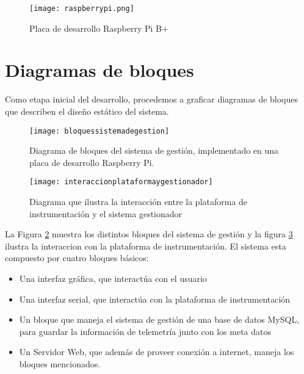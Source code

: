 \begin{figure}[h]
  \centering
  \texttt{[image: raspberrypi.png]}
  \caption{Placa de desarrollo Raspberry Pi B+}\label{fig:raspberrypi}
\end{figure}

\section{Diagramas de bloques} %
\label{it7:sec:diagramas_de_bloques}

Como etapa inicial del desarrollo, procedemos a graficar diagramas de bloques que describen el diseño estático del sistema.

\begin{figure}[h]
  \centering
  \texttt{[image: bloquessistemadegestion]}
  \caption{Diagrama de bloques del sistema de gestión, implementado en una placa de desarrollo Raspberry Pi.}\label{fig:bloquessistemadegestion}
\end{figure}

\begin{figure}[h]
  \centering
  \texttt{[image: interaccionplataformaygestionador]}
  \caption{Diagrama que ilustra la interacción entre la plataforma de instrumentación y el sistema gestionador}\label{fig:interaccionplataformaygestionador}
\end{figure}

La Figura \ref{fig:bloquessistemadegestion} muestra los distintos bloques del sistema de gestión y la figura \ref{fig:interaccionplataformaygestionador} ilustra la interaccion con la plataforma de instrumentación. El sistema esta compuesto por cuatro bloques básicos:

\begin{itemize}
  \item Una interfaz gráfica, que interactúa con el usuario
  \item Una interfaz serial, que interactúa con la plataforma de instrumentación
  \item Un bloque que maneja el sistema de gestión de una base de datos MySQL, para guardar la información de telemetría junto con los meta datos
  \item Un Servidor Web, que además de proveer conexión a internet, maneja los bloques mencionados.
\end{itemize}


